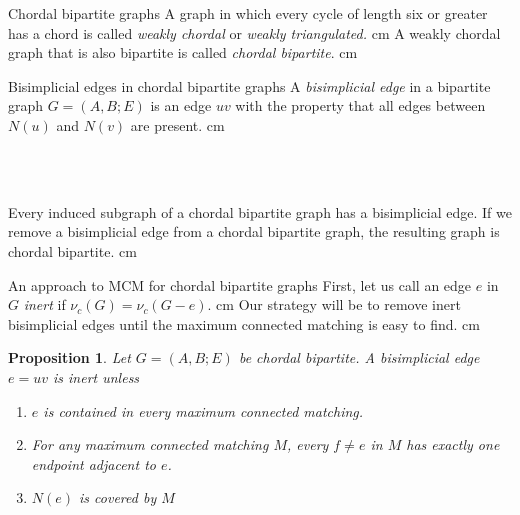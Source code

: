 \documentclass{beamer}
\newtheorem{prop}{Proposition}
\newcommand{\bframe}[2]{\begin{frame}{#1}#2\end{frame}}
\begin{document}
\bframe{Chordal bipartite graphs}{
A graph in which every cycle of length six or greater has a chord is called {\it weakly chordal} or {\it weakly triangulated.}
\pause\vskip 0.5 cm
A weakly chordal graph that is also bipartite is called {\it chordal bipartite}.\pause{} cm
\begin{center}  \end{center}
}

\bframe{Bisimplicial edges in chordal bipartite graphs}{
A {\it bisimplicial edge} in a bipartite graph $G = (A, B; E)$ is an edge $uv$ with the property that all edges between $N(u)$ and $N(v)$ are present.\pause\vskip 0.5 cm
\begin{center}\hspace{3cm}
\begin{overprint}
	\onslide<2>\hspace{3cm}\\
	\onslide<3>\hspace{3cm}\\
	\onslide<4->\hspace{3cm}
\end{overprint}
\end{center}\pause\pause\pause
Every induced subgraph of a chordal bipartite graph has a bisimplicial edge.  \pause If we remove a bisimplicial edge from a chordal bipartite graph, the resulting graph is chordal bipartite.\pause{} cm
}
\bframe{An approach to MCM for chordal bipartite graphs}{
First, let us call an edge $e$ in $G$ {\it inert} if $\nu_c(G) = \nu_c(G-e)$. \pause\vskip 0.5 cm
Our strategy will be to remove inert bisimplicial edges until the maximum connected matching is easy to find. \pause\vskip 0.5 cm
\begin{prop}
Let $G = (A, B; E)$ be chordal bipartite.  A bisimplicial edge $e = uv$ is inert unless
	\begin{enumerate}
		\item $e$ is contained in every maximum connected matching.
		\item For any maximum connected matching $M$, every $f\neq e $ in $M$ has exactly one endpoint adjacent to $e$.
		\item  $N(e)$ is covered by $M$
	\end{enumerate}
\end{prop}


}
\end{document}
